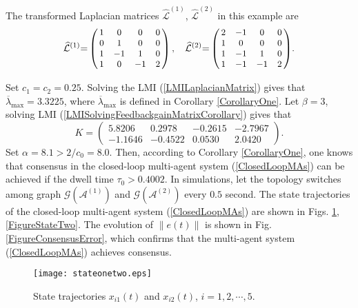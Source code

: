 \documentclass[letterpaper, 10 pt, conference]{ieeeconf}
\begin{document}
The transformed Laplacian matrices $\widehat{\mathcal{L}}^{(1)}$,
$\widehat{\mathcal{L}}^{(2)}$ in this example are
\begin{eqnarray*}
\small{\widehat{\mathcal{L}}^{(1)}{=}\left(\!\!\begin{array}{cccc}
     1 &    0 &    0 &    0\\
     0  &   1  &   0  &   0\\
     1  &  -1  &   1  &   0\\
     1  &   0  &  -1  &   2
\end{array}\!\!\right),\quad \widehat{\mathcal{L}}^{(2)}{=}\left(\!\!\begin{array}{cccc}
     2  &  -1  &   0  &   0\\
     1 &    0 &    0   &  0\\
     1  &  -1  &   1  &   0\\
     1 &   -1 &   -1 &    2
\end{array}\!\!\right)}.
\end{eqnarray*}

Set $c_{1}=c_{2}=0.25$. Solving the LMI (\ref{LMILaplacianMatrix}) gives
that $\overline{\lambda}_{\mathrm{max}}=3.3225$, where
$\overline{\lambda}_{\mathrm{max}}$ is defined in Corollary
\ref{CorollaryOne}. Let $\beta=3$, solving LMI
(\ref{LMISolvingFeedbackgainMatrixCorollary}) gives
that $$K=\left(\begin{array}{cccc}
 5.8206&    0.2978 &  -0.2615  & -2.7967\\
   -1.1646 &  -0.4522 &   0.0530  &  2.0420
\end{array}\right).$$  Set $\alpha=8.1>2/c_{0}=8.0$. Then, according to
Corollary \ref{CorollaryOne}, one knows that consensus in the closed-loop
multi-agent system (\ref{ClosedLoopMAs}) can be achieved if the dwell time
$\tau_{0}>  0.4002$. In simulations, let the topology switches among graph
$\mathcal{G}(\mathcal{A}^{(1)})$ and $\mathcal{G}(\mathcal{A}^{(2)})$ every
$0.5$ second. The state trajectories of the closed-loop multi-agent system
(\ref{ClosedLoopMAs}) are shown in Figs. \ref{FigureStateOne},
\ref{FigureStateTwo}. The evolution of $\|e(t)\|$ is shown in
Fig. \ref{FigureConsensusError}, which
confirms that the multi-agent system (\ref{ClosedLoopMAs}) achieves
consensus.


\begin{figure}[!t]
\centering
\texttt{[image: stateonetwo.eps]}
 \caption{State trajectories $x_{i1}(t)$ and $x_{i2}(t)$, $i=1,2,\cdots,5$. }
\label{FigureStateOne}
\end{figure}
\end{document}
